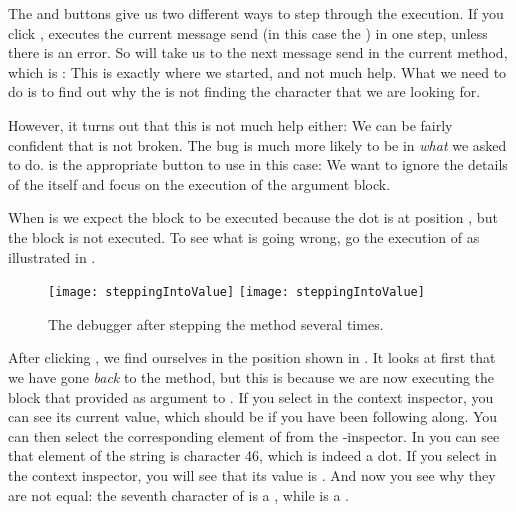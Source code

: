 \documentclass[a4paper,10pt,twoside]{book}
\begin{document}
The  and  buttons give us two different ways to step through the execution.
If you click , \sq executes the current message send (in this case the ) in one step, unless there is an error.
So  will take us to the next message send in the current method, which is :
This is exactly where we started, and not much help.
What we need to do is to find out why the  is not finding the character that we are looking for.



However, it turns out that this is not much help either:
We can be fairly confident that  is not broken.
The bug is much more likely to be in \emph{what} we asked \sq to do.
 is the appropriate button to use in this case:
We want to ignore the details of the  itself and focus on the execution of the argument block.


When  is  we expect the  block to be executed because the dot is at position , but the  block is not executed.
To see what is going wrong, go  the execution of  as illustrated in .

\begin{figure}[btp]
	\begin{center}
	\ifluluelse
		{\texttt{[image: steppingIntoValue]}}
		{\texttt{[image: steppingIntoValue]}}
	\end{center}
	\caption{The debugger after stepping  the  method several times.}
	\label{fig:steppingIntoValue}
\end{figure}

After clicking , we find ourselves in the position shown in .
It looks at first that we have gone \emph{back} to the  method, but this is because we are now executing the block that  provided as argument to .
If you select  in the context inspector, you can see its current value, which should be  if you have been following along.
You can then select the corresponding element of \self from the \self{}-inspector.
In  you can see that element  of the string is character 46, which is indeed a dot.
If you select  in the context inspector, you will see that its value is .
And now you see why they are not equal: the seventh character of  is a , while  is a .
\end{document}
